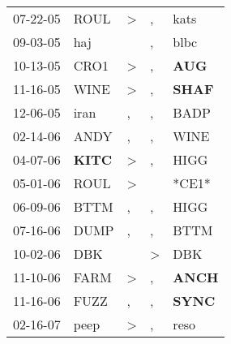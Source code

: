 \begin{supertabular}{p{0.07\textwidth}p{0.06\textwidth}p{0.02\textwidth}p{0.02\textwidth}p{0.06\textwidth}}
          07-22-05\textsuperscript{} &           ROUL\textsuperscript{} &     \textgreater &                , &           kats\textsuperscript{} \\
          09-03-05\textsuperscript{} &            haj\textsuperscript{} &                  &                , &           blbc\textsuperscript{} \\
          10-13-05\textsuperscript{} &           CRO1\textsuperscript{} &     \textgreater &                , &   \textbf{AUG\textsuperscript{}} \\
          11-16-05\textsuperscript{} &           WINE\textsuperscript{} &     \textgreater &                , &  \textbf{SHAF\textsuperscript{}} \\
          12-06-05\textsuperscript{} &           iran\textsuperscript{} &                , &                , &           BADP\textsuperscript{} \\
          02-14-06\textsuperscript{} &           ANDY\textsuperscript{} &                , &                , &           WINE\textsuperscript{} \\
          04-07-06\textsuperscript{} &  \textbf{KITC\textsuperscript{}} &     \textgreater &                , &           HIGG\textsuperscript{} \\
          05-01-06\textsuperscript{} &           ROUL\textsuperscript{} &     \textgreater &                  &                            *CE1* \\
          06-09-06\textsuperscript{} &           BTTM\textsuperscript{} &                , &                , &           HIGG\textsuperscript{} \\
          07-16-06\textsuperscript{} &           DUMP\textsuperscript{} &                , &                , &           BTTM\textsuperscript{} \\
          10-02-06\textsuperscript{} &            DBK\textsuperscript{} &                  &     \textgreater &            DBK\textsuperscript{} \\
          11-10-06\textsuperscript{} &           FARM\textsuperscript{} &     \textgreater &                , &  \textbf{ANCH\textsuperscript{}} \\
          11-16-06\textsuperscript{} &           FUZZ\textsuperscript{} &                , &                , &  \textbf{SYNC\textsuperscript{}} \\
          02-16-07\textsuperscript{} &           peep\textsuperscript{} &     \textgreater &                , &           reso\textsuperscript{} \\

\end{supertabular}

